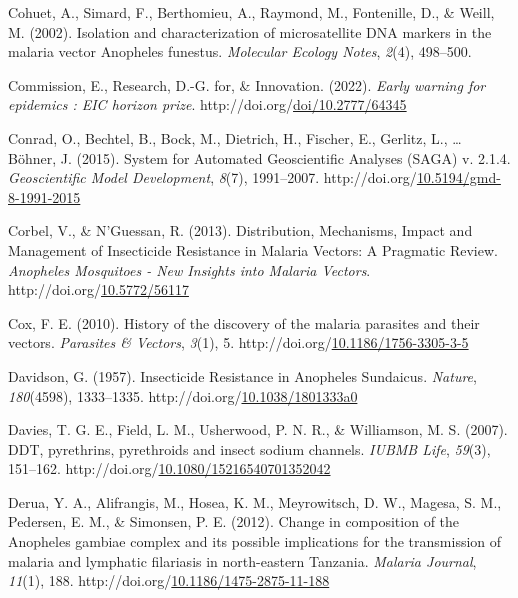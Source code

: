 \documentclass[12pt,twoside]{reedthesis}
\newlength{\cslhangindent}
\newenvironment{CSLReferences}[2] %
 {%
  \setlength{\parindent}{0pt}
  \ifodd #1 \everypar{\setlength{\hangindent}{\cslhangindent}}\ignorespaces\fi
  \ifnum #2 > 0
  \setlength{\parskip}{#2\baselineskip}
  \fi
 }%
 {}
\begin{document}
\begin{CSLReferences}{1}{0}
\leavevmode{}%
Cohuet, A., Simard, F., Berthomieu, A., Raymond, M., Fontenille, D., \& Weill, M. (2002). Isolation and characterization of microsatellite {DNA} markers in the malaria vector {Anopheles} funestus. \emph{Molecular Ecology Notes}, \emph{2}(4), 498--500.

\leavevmode{}%
Commission, E., Research, D.-G. for, \& Innovation. (2022). \emph{Early warning for epidemics : EIC horizon prize}. http://doi.org/\href{https://doi.org/doi/10.2777/64345}{doi/10.2777/64345}

\leavevmode{}%
Conrad, O., Bechtel, B., Bock, M., Dietrich, H., Fischer, E., Gerlitz, L., \ldots{} Böhner, J. (2015). System for {Automated} {Geoscientific} {Analyses} ({SAGA}) v. 2.1.4. \emph{Geoscientific Model Development}, \emph{8}(7), 1991--2007. http://doi.org/\href{https://doi.org/10.5194/gmd-8-1991-2015}{10.5194/gmd-8-1991-2015}

\leavevmode{}%
Corbel, V., \& N'Guessan, R. (2013). Distribution, {Mechanisms}, {Impact} and {Management} of {Insecticide} {Resistance} in {Malaria} {Vectors}: {A} {Pragmatic} {Review}. \emph{Anopheles Mosquitoes - New Insights into Malaria Vectors}. http://doi.org/\href{https://doi.org/10.5772/56117}{10.5772/56117}

\leavevmode{}%
Cox, F. E. (2010). History of the discovery of the malaria parasites and their vectors. \emph{Parasites \& Vectors}, \emph{3}(1), 5. http://doi.org/\href{https://doi.org/10.1186/1756-3305-3-5}{10.1186/1756-3305-3-5}

\leavevmode{}%
Davidson, G. (1957). Insecticide {Resistance} in {Anopheles} {Sundaicus}. \emph{Nature}, \emph{180}(4598), 1333--1335. http://doi.org/\href{https://doi.org/10.1038/1801333a0}{10.1038/1801333a0}

\leavevmode{}%
Davies, T. G. E., Field, L. M., Usherwood, P. N. R., \& Williamson, M. S. (2007). {DDT}, pyrethrins, pyrethroids and insect sodium channels. \emph{IUBMB Life}, \emph{59}(3), 151--162. http://doi.org/\href{https://doi.org/10.1080/15216540701352042}{10.1080/15216540701352042}

\leavevmode{}%
Derua, Y. A., Alifrangis, M., Hosea, K. M., Meyrowitsch, D. W., Magesa, S. M., Pedersen, E. M., \& Simonsen, P. E. (2012). Change in composition of the {Anopheles} gambiae complex and its possible implications for the transmission of malaria and lymphatic filariasis in north-eastern {Tanzania}. \emph{Malaria Journal}, \emph{11}(1), 188. http://doi.org/\href{https://doi.org/10.1186/1475-2875-11-188}{10.1186/1475-2875-11-188}


\end{CSLReferences}
\end{document}
